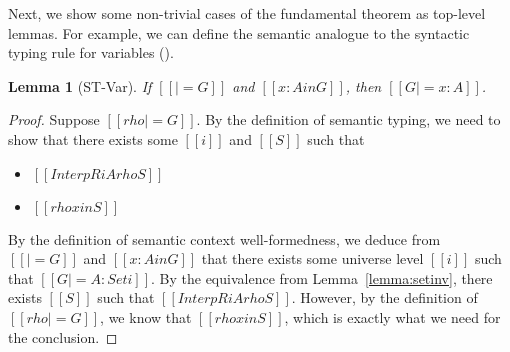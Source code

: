 \documentclass[\ifpublic nolinenum\else\fi,online,OA]{jfp}
\newcommand{\scw}[1]{}
\newtheorem{lemma}[theorem]{Lemma}
\theoremstyle{definition}
\begin{document}
Next, we show some non-trivial cases of the fundamental theorem as
top-level lemmas. For example, we can define the semantic analogue to the
syntactic typing rule for variables ().
\begin{lemma}[ST-Var]
  \label{lemma:stvar}
  If $[[|= G]]$ and $[[x : A in G]]$, then $[[G |= x : A]]$.
\end{lemma}
\begin{proof}
  Suppose $[[rho |= G]]$. By the definition of semantic typing, we
  need to show that there exists some $[[i]]$ and $[[S]]$ such that
  \begin{itemize}
  \item $[[InterpR i A { rho } S]]$
  \item $[[rho x in S]]$
  \end{itemize}
  By the definition of semantic context well-formedness, we deduce
  from $[[|= G]]$ and $[[x : A in G]]$ that there exists some universe
  level $[[i]]$ such that $[[G |= A : Set i]]$. By
  the equivalence from Lemma~\ref{lemma:setinv}, there exists $[[S]]$
  such that $[[InterpR i A {rho} S]]$. However, by the definition of
  $[[rho |= G]]$, we know that $[[rho x in S]]$, which is exactly what
  we need for the conclusion.
\end{proof}


\end{document}
